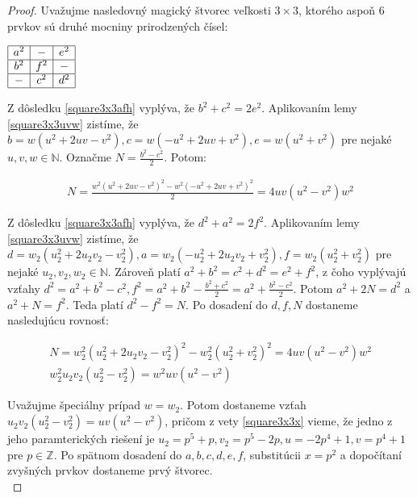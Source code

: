 \begin{proof} 
Uvažujme nasledovný magický štvorec veľkosti $3 \times 3$, ktorého aspoň $6$ prvkov sú druhé mocniny prirodzených čísel: \\

\begin{center}
$\begin{array}{ |c|c|c| } 
\hline
a^2 & - & e^2 \\ 
\hline
b^2 & f^2 & - \\ 
\hline
- & c^2 & d^2 \\
\hline
\end{array}$
\end{center}

Z dôsledku \ref{square3x3afh} vyplýva, že $b^2 + c^2 = 2e^2$. Aplikovaním lemy \ref{square3x3uvw} zistíme, že $b = w(u^2 + 2uv - v^2), c = w(- u^2 + 2uv + v^2), e = w(u^2 + v^2)$ pre nejaké $u,v,w \in \mathbb{N}$. Označme $N = \frac{b^2 - c^2}{2}$. Potom:

\begin{gather}
N = \frac{w^2(u^2 + 2uv - v^2)^2 - w^2(- u^2 + 2uv + v^2)^2}{2} = 4uv(u^2 - v^2)w^2
\end{gather}

Z dôsledku \ref{square3x3afh} vyplýva, že $d^2 + a^2 = 2f^2$. Aplikovaním lemy \ref{square3x3uvw} zistíme, že $d = w_2(u_2^2 + 2u_2 v_2 - v_2^2), a = w_2(- u_2^2 + 2u_2 v_2 + v_2^2), f = w_2(u_2^2 + v_2^2)$ pre nejaké $u_2,v_2,w_2 \in \mathbb{N}$. Zároveň platí $a^2 + b^2 = c^2 + d^2 = e^2 + f^2$, z čoho vyplývajú vzťahy $d^2 = a^2 + b^2 - c^2, f^2 = a^2 + b^2 - \frac{b^2 + c^2}{2} = a^2 + \frac{b^2 - c^2}{2}$.  Potom $a^2 + 2N = d^2$ a $a^2 + N = f^2$. Teda platí $d^2 - f^2 = N$. Po dosadení do $d,f,N$ dostaneme nasledujúcu rovnosť:

\begin{gather}
N = w_2^2(u_2^2 + 2u_2 v_2 - v_2^2)^2 - w_2^2(u_2^2 + v_2^2)^2 = 4u v(u^2 - v^2)w^2 \\
w_2^2 u_2 v_2 (u_2^2 - v_2^2) = w^2 uv (u^2 - v^2)
\end{gather}
 
Uvažujme špeciálny prípad $w = w_2$. Potom dostaneme vzťah $u_2 v_2 (u_2^2 - v_2^2) = uv (u^2 - v^2)$, pričom z vety \ref{square3x3x} vieme, že jedno z jeho paramterických riešení je $u_2 = p^5 + p, v_2 = p^5 - 2p, u = -2p^4 + 1, v = p^4 + 1$ pre $p \in \mathbb{Z}$. Po spätnom dosadení do $a,b,c,d,e,f$, substitúcii $x = p^2$ a dopočítaní zvyšných prvkov dostaneme prvý štvorec. \\


\end{proof}
